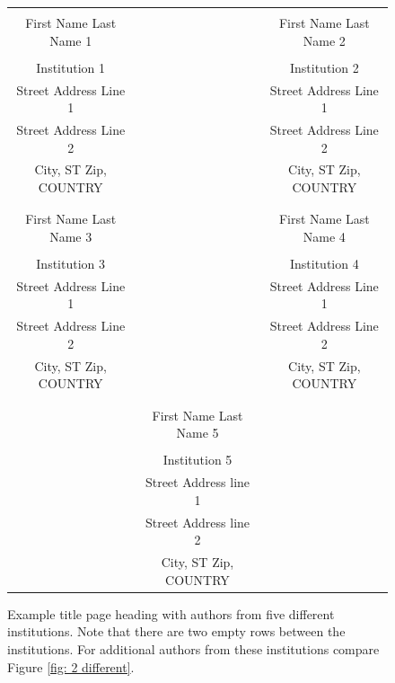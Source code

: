 \documentclass{wscpaperproc}
\theoremstyle{wsc}
\begin{document}
\begin{figure}[htb]
{
\centering
\begin{tabular}{ccc}
\phantom{Adjust spacing using these entries} & \phantom{intermediate space} & \phantom{Adjust spacing using these entries} \\
First Name Last Name 1 & & First Name Last Name 2 \\
\\
Institution 1 & & Institution 2 \\
Street Address Line 1 & & Street Address Line 1 \\
Street Address Line 2 & & Street Address Line 2 \\
City, ST Zip, COUNTRY & & City, ST Zip, COUNTRY \\
\\ \\
First Name Last Name 3 & & First Name Last Name 4 \\
\\
Institution 3 & & Institution 4 \\
Street Address Line 1 & & Street Address Line 1 \\
Street Address Line 2 & & Street Address Line 2 \\
City, ST Zip, COUNTRY & & City, ST Zip, COUNTRY \\
\\
\\
& First Name Last Name 5 \\
\\
& Institution 5\\
& Street Address line 1 \\
& Street Address line 2 \\
& City, ST Zip, COUNTRY
\end{tabular}
\caption{Example title page heading with authors from five different institutions. Note that there are two empty rows between the institutions. For additional authors from these institutions compare Figure \ref{fig: 2 different}. \label{fig: 5 different}}
}
\end{figure}
\end{document}
